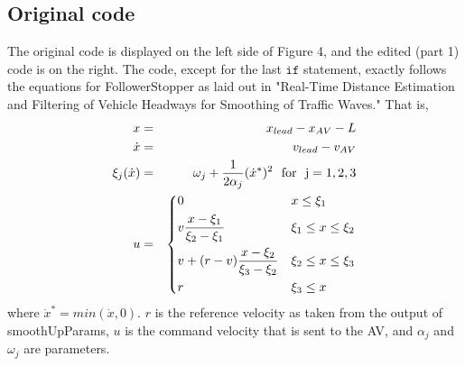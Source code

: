 \documentclass[12pt, letterpaper]{article}
\begin{document}
\subsection{Original code}
The original code is displayed on the left side of Figure 4, and the edited (part 1) code is on the right. The code, except for the last $\mathtt{if}$ statement, exactly follows the equations for FollowerStopper as laid out in "Real-Time Distance Estimation and Filtering of Vehicle Headways for Smoothing of Traffic Waves." That is,
\begin{eqnarray}
x 			&=& x_{lead}-x_{AV}-L \\
\dot x 		&=& v_{lead}-v_{AV} \\
\xi_j(\dot x)	&=& \omega_j + {1\over 2\alpha_j}(\dot x^*)^2 \ \ {\rm for \ \ j=1, 2, 3} \\
u &=& \begin{dcases}
        0 			& x\leq \xi_1 \\
        v{x-\xi_1\over\xi_2-\xi_1} 	& \xi_1\le x\leq \xi_2 \\
        v+(r-v){x-\xi_2\over\xi_3-\xi_2}			& \xi_2\le x\leq \xi_3 \\
        r 			& \xi_3\le x \\
    \end{dcases}
\end{eqnarray}
where $\dot x^* = min(\dot x, 0)$. $r$ is the reference velocity as taken from the output of smoothUpParams, $u$ is the command velocity that is sent to the AV, and $\alpha_j$ and $\omega_j$ are parameters.
\end{document}
